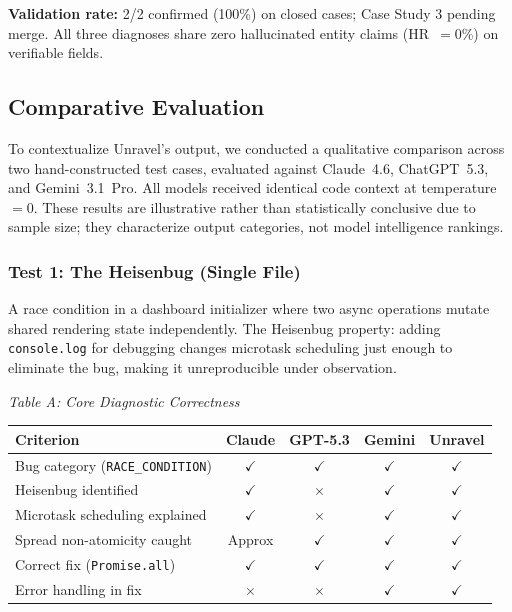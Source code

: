 \documentclass[12pt,a4paper]{article}
\newcommand{\code}[1]{\texttt{\small #1}}
\newcommand{\yes}{$\checkmark$}
\newcommand{\no}{$\times$}
\begin{document}
\textbf{Validation rate:} 2/2 confirmed (100\%) on closed cases; Case Study 3 pending
merge. All three diagnoses share zero hallucinated entity claims (HR~$=0$\%) on
verifiable fields.


\subsection{Comparative Evaluation}

To contextualize Unravel's output, we conducted a qualitative comparison across two
hand-constructed test cases, evaluated against Claude~4.6, ChatGPT~5.3, and
Gemini~3.1~Pro. All models received identical code context at temperature~$=0$. These
results are illustrative rather than statistically conclusive due to sample size; they
characterize output categories, not model intelligence rankings.

\subsubsection{Test 1: The Heisenbug (Single File)}

A race condition in a dashboard initializer where two async operations mutate shared
rendering state independently. The Heisenbug property: adding \code{console.log} for
debugging changes microtask scheduling just enough to eliminate the bug, making it
unreproducible under observation.

\vspace{4pt}
\textit{Table A: Core Diagnostic Correctness}
\vspace{2pt}

\begin{center}
\small\begin{tabular}{@{}p{5.2cm} cccc@{}}
\toprule
\textbf{Criterion} & \textbf{Claude} & \textbf{GPT-5.3} & \textbf{Gemini} & \textbf{Unravel} \\
\midrule
Bug category (\code{RACE\_CONDITION})   & \yes & \yes & \yes & \yes \\
Heisenbug identified                    & \yes & \no  & \yes & \yes \\
Microtask scheduling explained          & \yes & \no  & \yes & \yes \\
Spread non-atomicity caught             & Approx & \yes & \yes & \yes \\
Correct fix (\code{Promise.all})        & \yes & \yes & \yes & \yes \\
Error handling in fix                   & \no  & \no  & \yes & \yes \\
\bottomrule
\end{tabular}
\end{center}
\end{document}
